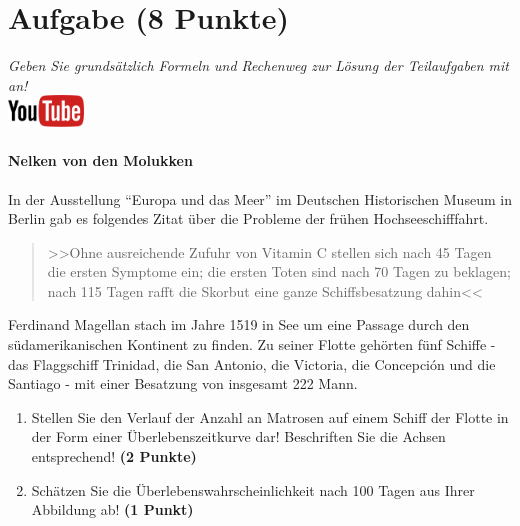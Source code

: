 \documentclass[a4paper, 9pt]{scrartcl}\usepackage[]{graphicx}\usepackage[]{xcolor}
\begin{document}
 
\clearpage

\section{Aufgabe \hfill (8 Punkte)}

\textit{Geben Sie grunds{\"a}tzlich Formeln und Rechenweg zur L{\"o}sung der
  Teilaufgaben mit an!} \\[1Ex]

\hfill\href{https://youtu.be/1B53cVFIU7Q}{\includegraphics[width =
  2cm]{img/youtube}} %
\hspace{2Ex}

\paragraph{Nelken von den Molukken}



In der Ausstellung "`Europa und das Meer"' im Deutschen Historischen Museum in
Berlin gab es folgendes Zitat {\"u}ber die Probleme der fr{\"u}hen Hochseeschifffahrt.

\begin{quote}
  >>Ohne ausreichende Zufuhr von Vitamin C stellen sich nach 45 Tagen die
  ersten Symptome ein; die ersten Toten sind nach 70 Tagen zu beklagen;
  nach 115 Tagen rafft die Skorbut eine ganze Schiffsbesatzung dahin<<
\end{quote}

Ferdinand Magellan stach im Jahre 1519 in See um eine Passage durch den
s{\"u}damerikanischen Kontinent zu finden. Zu seiner Flotte geh{\"o}rten
f{\"u}nf Schiffe - das Flaggschiff Trinidad, die San Antonio, die Victoria, die
Concepci{\'o}n und die Santiago - mit einer Besatzung von insgesamt
222 Mann. 

\begin{enumerate}
\item Stellen Sie den Verlauf der Anzahl an Matrosen auf einem Schiff der
  Flotte in der Form einer {\"U}berlebenszeitkurve dar! Beschriften Sie die
  Achsen entsprechend! \textbf{(2 Punkte)} 
\item Sch{\"a}tzen Sie die {\"U}berlebenswahrscheinlichkeit nach 100 Tagen
  aus Ihrer Abbildung ab! \textbf{(1 Punkt)} 
\end{enumerate}
\end{document}
